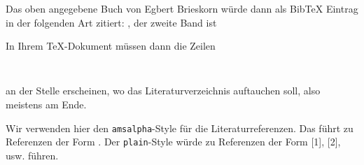 Das oben angegebene Buch von Egbert Brieskorn würde dann als BibTeX Eintrag in der folgenden Art zitiert: \cite{Brieskorn1983a}, der zweite Band ist \cite{Brieskorn1983b}

In Ihrem \TeX-Dokument müssen dann die Zeilen
\begin{verbatim}


\end{verbatim}
an der Stelle erscheinen, wo das Literaturverzeichnis auftauchen soll, also meistens am Ende. 

Wir verwenden hier den \texttt{amsalpha}-Style für die Literaturreferenzen. Das führt zu Referenzen der Form \cite{Raymond:2014uha}. Der \texttt{plain}-Style würde zu Referenzen der Form [1], [2], usw. führen.
